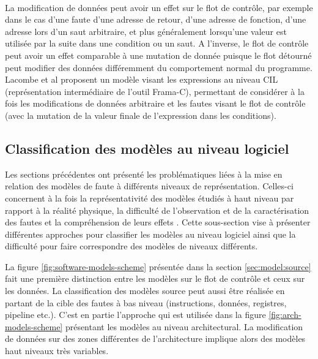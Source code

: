                 \paragraph{}                
                La modification de données peut avoir un effet sur le flot de contrôle, par exemple dans le cas d'une faute d'une adresse de retour, d'une adresse de fonction, d'une adresse lors d'un saut arbitraire, et plus généralement lorsqu'une valeur est utilisée par la suite dans une condition ou un saut. 
                A l'inverse, le flot de contrôle peut avoir un effet comparable à une mutation de donnée puisque le flot détourné peut modifier des données différemment du comportement normal du programme.
                Lacombe et al \cite{lacombe2021combining} proposent un modèle visant les expressions au niveau CIL (représentation intermédiaire de l'outil Frama-C), permettant de considérer à la fois les modifications de données arbitraire et les fautes visant le flot de contrôle (avec la mutation de la valeur finale de l'expression dans les conditions). 
                
        \subsection{Classification des modèles au niveau logiciel}
        \label{sec:model-classification}
        
            Les sections précédentes ont présenté les problématiques liées à la mise en relation des modèles de faute à différents niveaux de représentation.
            Celles-ci concernent à la fois la représentativité des modèles étudiés à haut niveau par rapport à la réalité physique, la difficulté de l'observation et de la caractérisation des fautes et la compréhension de leurs effets \cite{Dureuil/CARDIS15, werner2020end}.
            Cette sous-section vise à présenter différentes approches pour classifier les modèles au niveau logiciel ainsi que la difficulté pour faire correspondre des modèles de niveaux différents.
            
            La figure \ref{fig:software-models-scheme} présentée dans la section \ref{sec:model:source} fait une première distinction entre les modèles sur le flot de contrôle et ceux sur les données. 
            La classification des modèles source peut aussi être réalisée en partant de la cible des fautes à bas niveau (instructions, données, registres, pipeline etc.).
            C'est en partie l'approche qui est utilisée dans la figure \ref{fig:arch-models-scheme} présentant les modèles au niveau architectural.
            La modification de données sur des zones différentes de l'architecture implique alors des modèles haut niveaux très variables.
    
